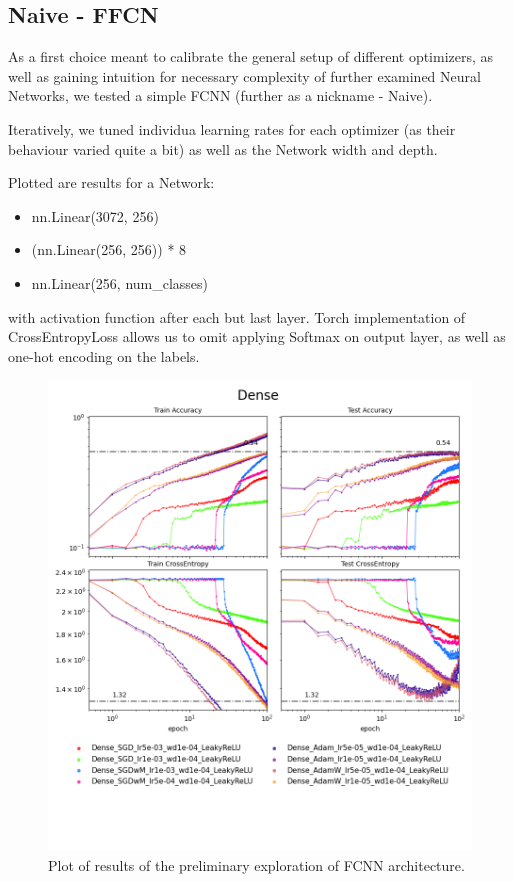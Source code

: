 \documentclass[12pt,a4paper]{article}
\begin{document}
\subsection{Naive - FFCN}

As a first choice meant to calibrate the general setup of
different optimizers, as well as gaining intuition for necessary
complexity of further examined Neural Networks, we tested a simple
FCNN (further as a nickname - Naive).

Iteratively, we tuned individua learning rates for each optimizer
(as their behaviour varied quite a bit) as well as the Network
width and depth. 

Plotted are results for a Network:
\begin{itemize}
  \item nn.Linear(3072, 256)
  \item (nn.Linear(256, 256)) * 8
  \item nn.Linear(256, num\_classes)
\end{itemize}
with activation function after each but last layer. Torch
implementation of CrossEntropyLoss allows us to omit applying
Softmax on output layer, as well as one-hot encoding on the
labels.

\begin{figure}[H]
  \includegraphics[width=\textwidth, trim={0, 3.5cm, 0, 0}, clip]{../logsDense.png}
  \caption{Plot of results of the preliminary exploration of FCNN
  architecture.}
\end{figure}
\end{document}
